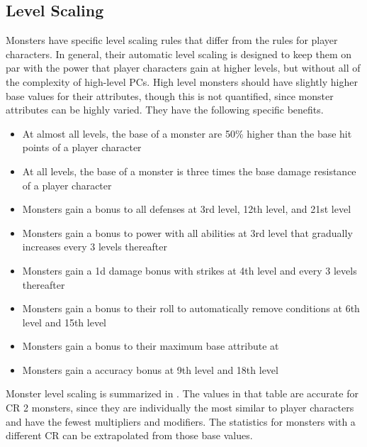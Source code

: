     \subsection{Level Scaling}
        Monsters have specific level scaling rules that differ from the rules for player characters.
        In general, their automatic level scaling is designed to keep them on par with the power that player characters gain at higher levels, but without all of the complexity of high-level PCs.
        High level monsters should have slightly higher base values for their attributes, though this is not quantified, since monster attributes can be highly varied.
        They have the following specific benefits.
        \begin{itemize}
            \item At almost all levels, the base  of a monster are 50\% higher than the base hit points of a player character
            \item At all levels, the base  of a monster is three times the base damage resistance of a player character
            \item Monsters gain a  bonus to all defenses at 3rd level, 12th level, and 21st level
            \item Monsters gain a  bonus to power with all abilities at 3rd level that gradually increases every 3 levels thereafter
            \item Monsters gain a \plus1d damage bonus with strikes at 4th level and every 3 levels thereafter
            \item Monsters gain a  bonus to their roll to automatically remove conditions at 6th level and 15th level
            \item Monsters gain a  bonus to their maximum base attribute at 
            \item Monsters gain a  accuracy bonus at 9th level and 18th level
        \end{itemize}

        Monster level scaling is summarized in .
        The values in that table are accurate for CR 2 monsters, since they are individually the most similar to player characters and have the fewest multipliers and modifiers.
        The statistics for monsters with a different CR can be extrapolated from those base values.

